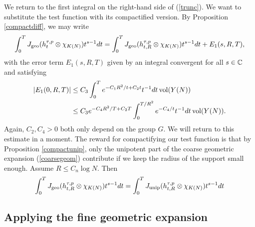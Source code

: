 \noindent We return to the first integral on the right-hand side of (\ref{trunc}). We want to substitute the test function with its compactified version. By Proposition \ref{compactdiff}, we may write
\begin{align*}
    \int_0^T J_{\operatorname{geo}}(h^{\tau,p}_t\otimes\chi_{K(N)})t^{s-1}dt = \int_0^T J_{\operatorname{geo}}(h^{\tau,p}_{t,R}\otimes\chi_{K(N)})t^{s-1}dt+E_1(s,R,T),
\end{align*}
with the error term $E_1(s,R,T)$ given by an integral convergent for all $s\in\mathbb{C}$ and satisfying
\begin{align}\label{error1}
    |E_1(0,R,T)| &\leq C_3\int_0^Te^{-C_1R^2/t+C_2t}t^{-1}dt\operatorname{vol}(Y(N)) \\
    &\leq C_3e^{-C_4R^2/T+C_2T}\int_0^{T/R^2}e^{-C_4/t}t^{-1}dt\operatorname{vol}(Y(N)).
\end{align}
Again, $C_2,C_4>0$ both only depend on the group $G$. We will return to this estimate in a moment. The reward for compactifying our test function is that by Proposition \ref{compactunip}, only the unipotent part of the coarse geometric expansion (\ref{coarsegeom}) contribute if we keep the radius of the support small enough. Assume $R\leq C_n\log N$. Then
\begin{align*}
    \int_0^T J_{\operatorname{geo}}(h^{\tau,p}_{t,R}\otimes\chi_{K(N)})t^{s-1}dt = \int_0^T J_{\operatorname{unip}}(h^{\tau,p}_{t,R}\otimes\chi_{K(N)})t^{s-1}dt
\end{align*}

\bigskip

\subsection{Applying the fine geometric expansion}\label{applyingfine}

